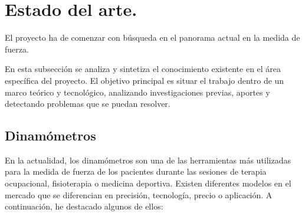 \section{Estado del arte.}

El proyecto ha de comenzar con búsqueda en el panorama actual en la medida de fuerza. 

En esta subsección se analiza y sintetiza el conocimiento existente en el área específica del proyecto. El objetivo principal es situar el trabajo dentro de un marco teórico y tecnológico, analizando investigaciones previas, aportes y detectando problemas que se puedan resolver.
\subsection{Dinamómetros}
En la actualidad, los dinamómetros son una de las herramientas más utilizadas  para la medida de fuerza de los pacientes durante las sesiones de terapia ocupacional, fisioterapia o medicina deportiva. Existen diferentes modelos en el mercado que se diferencian en precisión, tecnología, precio o aplicación. 
A continuación, he destacado algunos de ellos:
